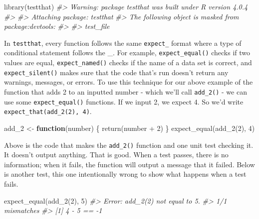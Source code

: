 \documentclass[
  12pt,
]{book}
\newenvironment{Shaded}{\begin{snugshade}}{\end{snugshade}}
\newcommand{\CommentTok}[1]{\textcolor[rgb]{0.37,0.37,0.37}{\textit{#1}}}
\newcommand{\ControlFlowTok}[1]{\textcolor[rgb]{0.27,0.27,0.27}{\textbf{#1}}}
\newcommand{\DecValTok}[1]{\textcolor[rgb]{0.06,0.06,0.06}{#1}}
\newcommand{\FunctionTok}[1]{\textcolor[rgb]{0,0,0}{#1}}
\newcommand{\NormalTok}[1]{#1}
\newcommand{\OtherTok}[1]{\textcolor[rgb]{0.37,0.37,0.37}{#1}}
\newcommand{\SpecialCharTok}[1]{\textcolor[rgb]{0,0,0}{#1}}
\begin{document}
\begin{Shaded}
\begin{Highlighting}[]
\FunctionTok{library}\NormalTok{(testthat)}
\CommentTok{\#\textgreater{} Warning: package \textquotesingle{}testthat\textquotesingle{} was built under R version 4.0.4}
\CommentTok{\#\textgreater{} }
\CommentTok{\#\textgreater{} Attaching package: \textquotesingle{}testthat\textquotesingle{}}
\CommentTok{\#\textgreater{} The following object is masked from \textquotesingle{}package:devtools\textquotesingle{}:}
\CommentTok{\#\textgreater{} }
\CommentTok{\#\textgreater{}     test\_file}
\end{Highlighting}
\end{Shaded}

In \texttt{testthat}, every function follows the same \texttt{expect\_} format where a type of conditional statement follows the \_. For example, \texttt{expect\_equal()} checks if two values are equal, \texttt{expect\_named()} checks if the name of a data set is correct, and \texttt{expect\_silent()} makes sure that the code that's run doesn't return any warnings, messages, or errors. To use this technique for our above example of the function that adds 2 to an inputted number - which we'll call \texttt{add\_2()} - we can use some \texttt{expect\_equal()} functions. If we input 2, we expect 4. So we'd write \texttt{expect\_that(add\_2(2),\ 4)}.

\begin{Shaded}
\begin{Highlighting}[]
\NormalTok{add\_2 }\OtherTok{\textless{}{-}} \ControlFlowTok{function}\NormalTok{(number) \{ }\FunctionTok{return}\NormalTok{(number }\SpecialCharTok{+} \DecValTok{2}\NormalTok{) \}}
\FunctionTok{expect\_equal}\NormalTok{(}\FunctionTok{add\_2}\NormalTok{(}\DecValTok{2}\NormalTok{), }\DecValTok{4}\NormalTok{)}
\end{Highlighting}
\end{Shaded}

Above is the code that makes the \texttt{add\_2()} function and one unit test checking it. It doesn't output anything. That is good. When a test passes, there is no information; when it fails, the function will output a message that it failed. Below is another test, this one intentionally wrong to show what happens when a test fails.

\begin{Shaded}
\begin{Highlighting}[]
\FunctionTok{expect\_equal}\NormalTok{(}\FunctionTok{add\_2}\NormalTok{(}\DecValTok{2}\NormalTok{), }\DecValTok{5}\NormalTok{)}
\CommentTok{\#\textgreater{} Error: add\_2(2) not equal to 5.}
\CommentTok{\#\textgreater{} 1/1 mismatches}
\CommentTok{\#\textgreater{} [1] 4 {-} 5 == {-}1}
\end{Highlighting}
\end{Shaded}
\end{document}
